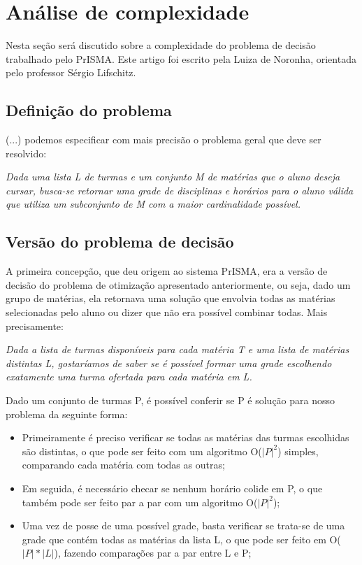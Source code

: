 \documentclass[graduacao,brazil]{ThesisPUC}
\begin{document}
\arial
\nocite{*}


\normalfont

\appendix
\chapter{Análise de complexidade}

Nesta seção será discutido sobre a complexidade do problema de decisão trabalhado pelo PrISMA. Este artigo foi escrito pela Luiza de Noronha, orientada pelo professor Sérgio Lifschitz.

\section{Definição do problema}

(...) podemos especificar com mais precisão o problema geral que deve ser resolvido:

\vspace{3 mm}
\textit{Dada uma lista L de turmas e um conjunto M de matérias que o aluno deseja cursar, busca-se retornar uma grade de disciplinas e horários para o aluno válida que utiliza um subconjunto de M com a maior cardinalidade possível.}
\vspace{3 mm}

\section{Versão do problema de decisão}

A primeira concepção, que deu origem ao sistema PrISMA, era a versão de decisão do problema de otimização apresentado anteriormente, ou seja, dado um grupo de matérias, ela retornava uma solução que envolvia todas as matérias selecionadas pelo aluno ou dizer que não era possível combinar todas. Mais precisamente:

\vspace{3 mm}
\textit{Dada a lista de turmas disponíveis para cada matéria T e uma lista de matérias distintas L, gostaríamos de saber se é possível formar uma grade escolhendo exatamente uma turma ofertada para cada matéria em L.}
\vspace{3 mm}

Dado um conjunto de turmas P, é possível conferir se P é solução para nosso problema da seguinte forma:

\begin{itemize}
	\item Primeiramente é preciso verificar se todas as matérias das turmas escolhidas são distintas, o que pode ser feito com um algoritmo O($|P|^2$) simples, comparando cada matéria com todas as outras;
	\item Em seguida, é necessário checar se nenhum horário colide em P, o que também pode ser feito par a par com um algoritmo O($|P|^2$);
	\item Uma vez de posse de uma possível grade, basta verificar se trata-se de uma grade que contém todas as matérias da lista L, o que pode ser feito em O($|P|*|L|$), fazendo comparações par a par entre L e P;
\end{itemize}
\end{document}
